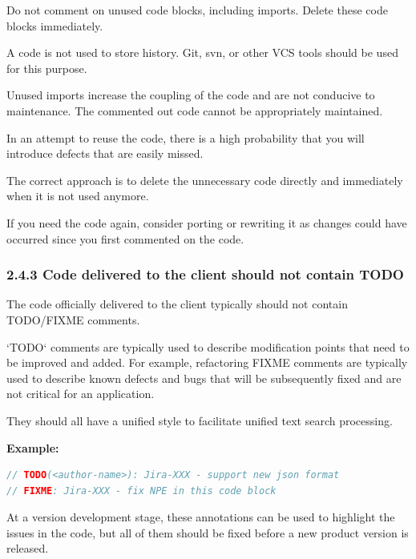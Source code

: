 Do not comment on unused code blocks, including imports. Delete these code blocks immediately.

A code is not used to store history. Git, svn, or other VCS tools should be used for this purpose.

Unused imports increase the coupling of the code and are not conducive to maintenance. The commented out code cannot be appropriately maintained.

In an attempt to reuse the code, there is a high probability that you will introduce defects that are easily missed.

The correct approach is to delete the unnecessary code directly and immediately when it is not used anymore.

If you need the code again, consider porting or rewriting it as changes could have occurred since you first commented on the code. 



\subsubsection*{\textbf{2.4.3 Code delivered to the client should not contain TODO}}
\leavevmode\newline

\label{sec:2.4.3}



The code officially delivered to the client typically should not contain TODO/FIXME comments.

`TODO` comments are typically used to describe modification points that need to be improved and added. For example, refactoring FIXME comments are typically used to describe known defects and bugs that will be subsequently fixed and are not critical for an application.

They should all have a unified style to facilitate unified text search processing.



\textbf{Example:}



\begin{lstlisting}[language=Kotlin]
// TODO(<author-name>): Jira-XXX - support new json format
// FIXME: Jira-XXX - fix NPE in this code block
\end{lstlisting}


At a version development stage, these annotations can be used to highlight the issues in the code, but all of them should be fixed before a new product version is released.


